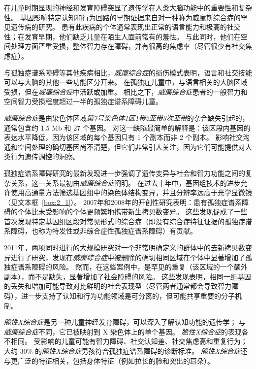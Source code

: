 在儿童时期显现的神经和发育障碍突显了遗传学在人类大脑功能中的重要性和复杂性。
基因影响特定认知和行为回路的早期证据来自对一种称为威廉斯综合症的罕见遗传病的研究。
患有此疾病的个体通常表现出正常的语言能力和极高的社交性；在发育早期，他们缺乏儿童在陌生人面前常有的羞怯。
与此同时，他们在空间处理方面严重受损，整体智力存在障碍，并有很高的焦虑率（尽管很少有社交焦虑症）。


与孤独症谱系障碍等其他疾病相比，\textit{威廉综合症}的损伤模式表明，语言和社交技能可以与大脑的其他一些功能区分开来。
在孤独症儿童中，与语言相关的大脑区域受损，但在\textit{威廉综合症}中活跃或加重。
相比之下，\textit{威廉综合症}患者的一般智力和空间智力受损程度超过一半的孤独症谱系障碍儿童。


\textit{威廉综合症}是由染色体区域\textit{第7号染色体1区1带2亚带3次亚带}的杂合缺失引起的，通常包含约 1.5 Mb 和 27 个基因。
对这一缺陷最简单的解释是：该区段内基因的表达水平降低，因为该区域的每个基因只有 1 个副本而非 2 个副本。
影响社交沟通和空间处理的确切基因尚不清楚，但它们非常引人关注，因为它们可能提供对人类行为遗传调控的洞察。



孤独症谱系障碍研究的最新发现进一步强调了遗传变异与社会和智力功能之间的复杂关系，这一关系最初由\textit{威廉综合症}阐明。
在过去十年中，基因组技术的进步允许使用高通量方法筛选基因组中的染色体结构变异，并且分辨率远高于光学显微镜（见文本框~\ref{box:2_1}）。
2007年和2008年的开创性研究表明：患有孤独症谱系障碍的个体比未受影响的个体更频繁地携带新生拷贝数变异。
这些发现促成了一些首次发现特定基因组区段对常见形式的综合症（即没有综合症特征证据的孤独症谱系障碍，也称为特发性或非综合症性孤独症谱系障碍）有贡献。


2011年，两项同时进行的大规模研究对一个非常明确定义的群体中的去新拷贝数变异进行了研究，发现在\textit{威廉综合症}中被删除的确切相同区域在个体中显著增加了孤独症谱系障碍的风险。
然而，在这些案例中，是罕见的重复（该区域的一个额外副本），而不是缺失，显著增加了社会障碍的风险。
这些发现表明，相同一组基因的丢失和增加可能导致对比鲜明的社会表现型（尽管两者通常都会导致智力障碍），进一步支持了认知和行为功能领域是可分离的，但可能共享重要的分子机制。



\textit{脆性X综合症}是另一种儿童神经发育障碍，可以深入了解认知功能的遗传学；
与\textit{威廉综合症}不同，它已被映射到 X 染色体上的单个基因。
\textit{脆性X综合症}的表现各不相同。
受影响的儿童可能有智力障碍、社交认知差、社交焦虑高和重复行为；
大约 30\% 的\textit{脆性X综合症}男孩符合孤独症谱系障碍的诊断标准。
\textit{脆性X综合症}还与更广泛的特征相关，包括身体特征（例如拉长的脸和突出的耳朵）。



